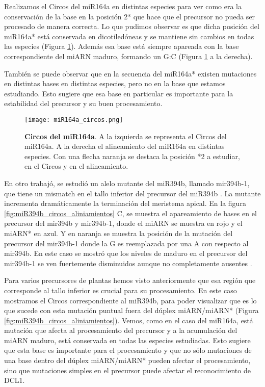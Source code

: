 Realizamos el Circos del miR164a en distintas especies para ver como era la conservación de la base en la posición 2* que hace que el precursor no pueda ser procesado de manera correcta.
Lo que pudimos observar es que dicha posición del miR164a* está conservada en dicotiledóneas y se mantiene sin cambios en todas las especies (Figura \ref{fig:miR164a_circos}).
Además esa base está siempre apareada con la base correspondiente del miARN maduro, formando un G:C (Figura \ref{fig:miR164a_circos} a la derecha).

También se puede observar que en la secuencia del miR164a* existen mutaciones en distintas bases en distintas especies, pero no en la base que estamos estudiando.
Esto sugiere que esa base en particular es importante para la estabilidad del precursor y su buen procesamiento.

    \begin{figure}[htbp!] 
        \centering    
        \texttt{[image: miR164a\_circos.png]}
        \caption[Circos del miR164a]{
			\textbf{Circos del miR164a}.
			A la izquierda se representa el Circos del miR164a.
			A la derecha el alineamiento del miR164a en distintas especies. 
			Con una flecha naranja se destaca la posición *2 a estudiar, en el Circos y en el alineamiento.
        }
        \label{fig:miR164a_circos}
    \end{figure}

En otro trabajó, se estudió un alelo mutante del miR394b, llamado mir394b-1, que tiene un mismatch en el tallo inferior del precursor del miR394b \citep{pmid23333352}.
La mutante incrementa dramáticamente la terminación del meristema apical.   
En la figura \ref{fig:miR394b_circos_aliniamientos} C, se muestra el apareamiento de bases en el precursor del mir394b y mir394b-1, donde el miARN se muestra en rojo y el miARN* en azul.
Y en naranja se muestra la posición de la mutación del precursor del mir394b-1 donde la G es reemplazada por una A con respecto al mir394b.
En este caso se mostró que los niveles de maduro en el precursor del mir394b-1 se ven fuertemente disminuidos aunque no completamente ausentes \citep{pmid23333352}. 

Para varios precursores de plantas hemos visto anteriormente que esa región que corresponde al tallo inferior es crucial para su procesamiento.
En este caso mostramos el Circos correspondiente al miR394b, para poder visualizar que es lo que sucede con esta mutación puntual fuera del dúplex miARN/miARN* (Figura \ref{fig:miR394b_circos_aliniamientos}).
Vemos, como en el caso del miR164a, está mutación que afecta al procesamiento del precursor y a la acumulación del miARN maduro, está conservada en todas las especies estudiadas.
Esto sugiere que esta base es importante para el procesamiento y que no sólo mutaciones de una base dentro del dúplex miARN/miARN* pueden afectar el procesamiento, sino que mutaciones simples en el precursor puede afectar el reconocimiento de DCL1. 

